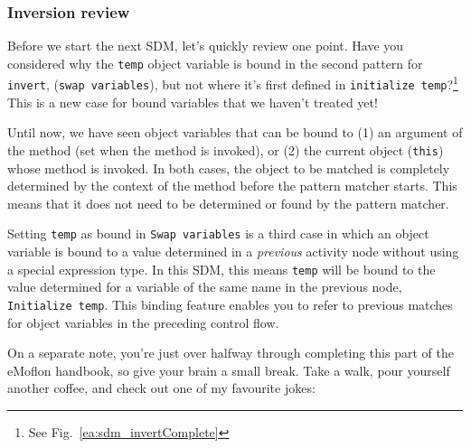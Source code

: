 \newpage
\subsubsection{Inversion review}
\genHeader
\hypertarget{invert close}{}

Before we start the next SDM, let's quickly review one point. Have you considered why the \texttt{temp} object variable is bound in the second pattern for
\texttt{invert}, (\texttt{swap variables}), but not where it's first defined in \texttt{initialize temp}?\footnote{See Fig.~\ref{ea:sdm_invertComplete}} This is a new case for bound variables that we haven't treated yet!

Until now, we have seen object variables that can be bound to (1) an argument of the method (set when the method is invoked), or (2) the
current object (\texttt{this}) whose method is invoked. In both cases, the object to be matched is completely determined by the context of the method before
the pattern matcher starts. This means that it does not need to be determined or found by the pattern matcher.

Setting \texttt{temp} as bound in \texttt{Swap variables} is a third case in which an object variable is bound to a value determined in a \emph{previous}
activity node without using a special expression type. In this SDM, this means \texttt{temp} will be bound to the value determined for a variable
of the same name in the previous node, \texttt{Initialize temp}. This binding feature enables you to refer to previous matches for object variables in the
preceding control flow.

On a separate note, you're just over halfway through completing this part of the eMoflon handbook, so give your brain a small break. Take a walk, pour
yourself another coffee, and check out one of my favourite jokes:

\vspace{0.5cm}

